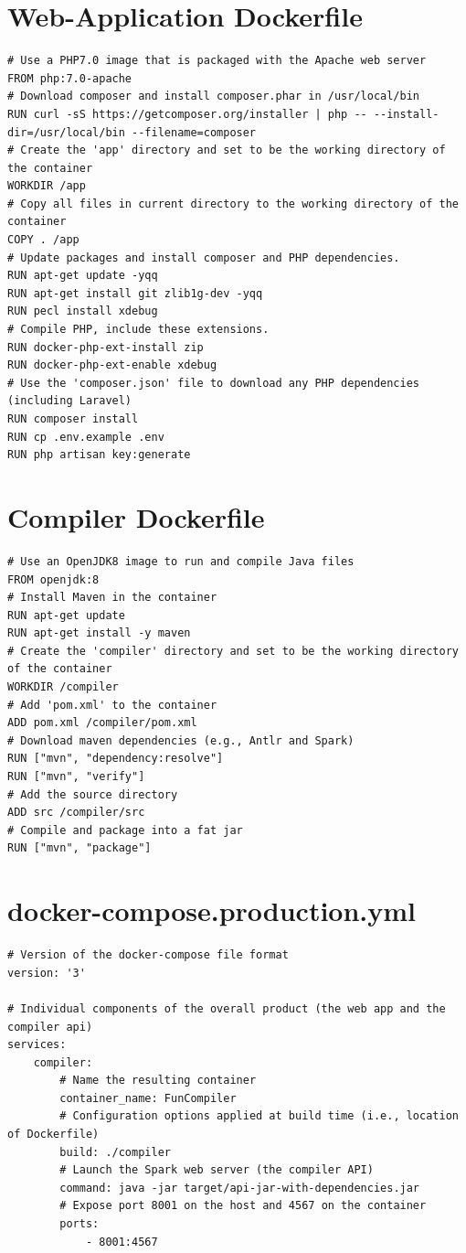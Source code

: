 \documentclass{l4proj}
\begin{document}
\begin{appendices}
\section{Web-Application Dockerfile}
\label{sec:web-dockerfile}
\begin{lstlisting}
# Use a PHP7.0 image that is packaged with the Apache web server
FROM php:7.0-apache
# Download composer and install composer.phar in /usr/local/bin
RUN curl -sS https://getcomposer.org/installer | php -- --install-dir=/usr/local/bin --filename=composer
# Create the 'app' directory and set to be the working directory of the container
WORKDIR /app
# Copy all files in current directory to the working directory of the container
COPY . /app
# Update packages and install composer and PHP dependencies.
RUN apt-get update -yqq
RUN apt-get install git zlib1g-dev -yqq
RUN pecl install xdebug
# Compile PHP, include these extensions.
RUN docker-php-ext-install zip
RUN docker-php-ext-enable xdebug
# Use the 'composer.json' file to download any PHP dependencies (including Laravel)
RUN composer install
RUN cp .env.example .env
RUN php artisan key:generate
\end{lstlisting}

\section{Compiler Dockerfile}
\label{sec:compiler-dockerfile}
\begin{lstlisting}
# Use an OpenJDK8 image to run and compile Java files
FROM openjdk:8
# Install Maven in the container
RUN apt-get update
RUN apt-get install -y maven
# Create the 'compiler' directory and set to be the working directory of the container
WORKDIR /compiler
# Add 'pom.xml' to the container
ADD pom.xml /compiler/pom.xml
# Download maven dependencies (e.g., Antlr and Spark)
RUN ["mvn", "dependency:resolve"]
RUN ["mvn", "verify"]
# Add the source directory
ADD src /compiler/src
# Compile and package into a fat jar
RUN ["mvn", "package"]
\end{lstlisting}

\section{docker-compose.production.yml}
\label{sec:docker-compose}
\begin{lstlisting}
# Version of the docker-compose file format
version: '3'

# Individual components of the overall product (the web app and the compiler api)
services:
    compiler:
        # Name the resulting container
        container_name: FunCompiler
        # Configuration options applied at build time (i.e., location of Dockerfile)
        build: ./compiler
        # Launch the Spark web server (the compiler API)
        command: java -jar target/api-jar-with-dependencies.jar
        # Expose port 8001 on the host and 4567 on the container
        ports:
            - 8001:4567


\end{lstlisting}
\end{appendices}
\end{document}
